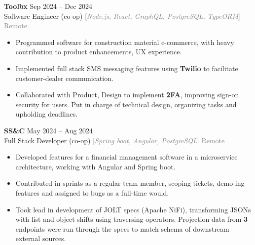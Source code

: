 \documentclass[9pt]{developercv} %
\begin{document}
\begin{minipage}[t]{\textwidth}
	\vspace{-\baselineskip}

	\textbf{Toolbx} \hfill Sep 2024 -- Dec 2024 \\
	Software Engineer (co-op) \quad \textcolor{gray}{[\;\textit{Node.js, React, GraphQL, PostgreSQL, TypeORM}\;]} \hfill \textcolor{gray}{Remote}
	\begin{itemize}[noitemsep,topsep=0pt]
		\item Programmed software for construction material e-commerce,
		with heavy contribution to product enhancements, UX experience.
		\item Implemented full stack SMS messaging features using \textbf{Twilio} to facilitate customer-dealer communication.
		\item Collaborated with Product, Design to implement \textbf{2FA}, improving sign-on security for users. Put in charge of technical design, organizing tasks and upholding deadlines.
	\end{itemize}
	\vspace{0.3em}

	\textbf{SS\&C} \hfill May 2024 -- Aug 2024 \\
	Full Stack Developer (co-op) \quad \textcolor{gray}{[\;\textit{Spring boot, Angular, PostgreSQL}\;]} \hfill \textcolor{gray}{Remote}
	\begin{itemize}[noitemsep,topsep=0pt]
		\item Developed features for a financial management software in a microservice architecture, working with Angular and Spring boot.
		\item Contributed in sprints as a regular team member, scoping tickets, demo-ing features and assigned to bugs as a full-time would.
		\item Took lead in development of JOLT specs (Apache NiFi), transforming JSONs with list and object shifts using traversing operators.
		Projection data from \textbf{3} endpoints were run through the specs to match schema of downstream external sources.
	\end{itemize}
	\vspace{0.3em}


\end{minipage}
\end{document}
